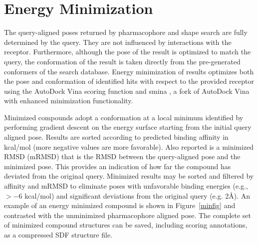 \section{Energy Minimization}

The query-aligned poses returned by pharmacophore and shape search are fully determined by the query. They are not influenced by interactions with the receptor.  Furthermore, although the pose of the result is optimized to match the query, the conformation of the result is taken directly from the pre-generated conformers of the search database.  Energy minimization of results optimizes both the pose and conformation of identified hits with respect to the provided receptor using the AutoDock Vina \cite{Trott_2009} scoring function and smina \cite{smina}, a fork of AutoDock Vina with enhanced minimization functionality. 

Minimized compounds adopt a conformation at a local minimum identified by performing gradient descent on the energy surface starting from the initial query aligned pose.
Results are sorted according to predicted binding affinity in kcal/mol (more negative values are more favorable).  Also reported is a minimized RMSD (mRMSD) that is the RMSD between the query-aligned pose and the minimized pose.  This provides an indication of how far the compound has deviated from the original query.  Minimized results may be sorted and filtered by affinity and mRMSD to eliminate poses with unfavorable binding energies (e.g., $>-6$ kcal/mol) and significant deviations from the original query (e.g. 2{\AA}). An example of an energy minimized compound is shown in Figure~\ref{minfig} and contrasted with the unminimized pharmacophore aligned pose. The complete set of minimized compound structures can be saved, including scoring annotations, as a compressed SDF structure file.